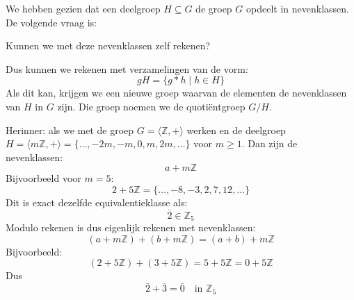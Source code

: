 We hebben gezien dat een deelgroep $H \subseteq G$ de groep $G$ opdeelt in nevenklassen. De volgende vraag is:
\begin{center}
    Kunnen we met deze nevenklassen zelf rekenen?
\end{center}
Dus kunnen we rekenen met verzamelingen van de vorm:
\begin{equation*}
    gH = \{g*h \mid h \in H\}
\end{equation*}
Als dit kan, krijgen we een nieuwe groep waarvan de elementen de nevenklassen van $H$ in $G$ zijn. Die groep noemen we de quotiëntgroep $G/H$.


Herinner: als we met de groep $G = \langle \mathbb{Z},+ \rangle$ werken en de deelgroep $H = \langle m\mathbb{Z},+\rangle = \{\dots, -2m,-m,0,m,2m,\dots\}$ voor $m \ge 1$. Dan zijn de nevenklassen:
\begin{equation*}
    a + m\mathbb{Z}
\end{equation*}
Bijvoorbeeld voor $m=5$:
\begin{equation*}
    2 + 5\mathbb{Z} = \{\dots, -8, -3, 2, 7, 12, \dots\}
\end{equation*}
Dit is exact dezelfde equivalentieklasse als:
\begin{equation*}
    \bar{2} \in \mathbb{Z}_5
\end{equation*}
Modulo rekenen is dus eigenlijk rekenen met nevenklassen:
\begin{equation*}
    (a + m\mathbb{Z}) + (b+m\mathbb{Z}) = (a+b) + m\mathbb{Z}
\end{equation*}
Bijvoorbeeld:
\begin{equation*}
    (2 + 5\mathbb{Z}) + (3 + 5\mathbb{Z}) = 5 + 5\mathbb{Z} = 0 + 5\mathbb{Z}
\end{equation*}
Dus
\begin{equation*}
    \bar{2} + \bar{3} = \bar{0} \quad \text{in } \mathbb{Z}_5
\end{equation*}


